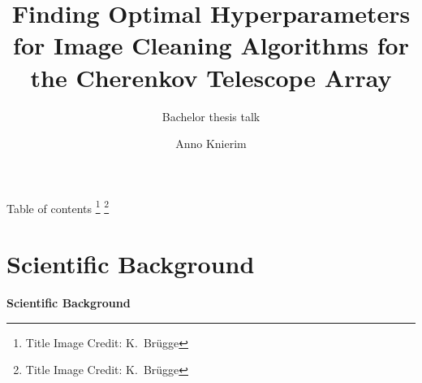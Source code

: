 
 {}
 {\def\theme{-1}}

  {%
  }
  {%
  }



\title{Finding Optimal Hyperparameters for Image Cleaning Algorithms for the Cherenkov Telescope Array}
\subtitle{Bachelor thesis talk}
\author[A.~Knierim]{Anno Knierim} %




\maketitle

\begin{frame}[label=title]{Table of contents}
  \tableofcontents
  \vfill
  {%
  \footnote{\textcolor{white!85!black}{Title Image Credit: K.~Br\"{u}gge}}
  }
  {%
  \footnote{\textcolor{darkgray!85!black}{Title Image Credit: K.~Br\"{u}gge}}
  }
\end{frame}


\section{Scientific Background}%
\label{sec:introduction}

\begin{frame}
  \begin{center}
    \textbf{\huge Scientific Background}\\
  \end{center}
\end{frame}



